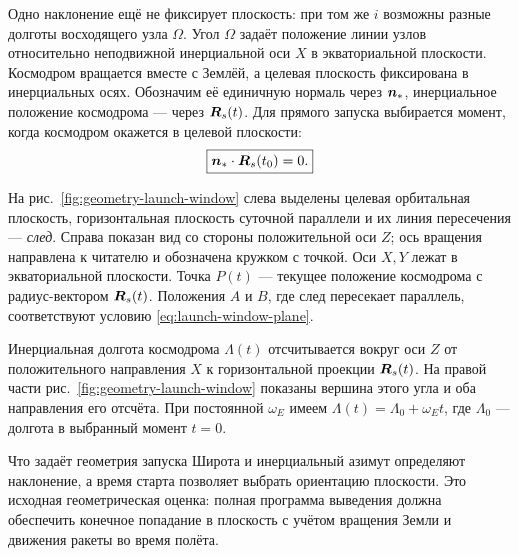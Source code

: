 Одно наклонение ещё не фиксирует плоскость: при том же $i$
возможны разные долготы восходящего узла $\Omega$.
Угол $\Omega$ задаёт положение линии узлов относительно
неподвижной инерциальной оси $X$ в экваториальной плоскости.
Космодром вращается вместе с Землёй, а целевая плоскость
фиксирована в инерциальных осях. Обозначим её единичную нормаль
через $\boldsymbol{n}_*$, инерциальное положение космодрома ---
через $\boldsymbol{R}_s(t)$. Для прямого запуска выбирается момент,
когда космодром окажется в целевой плоскости:
\begin{equation}
 \boxed{\boldsymbol{n}_*\cdot\boldsymbol{R}_s(t_0)=0.}
 \label{eq:launch-window-plane}
\end{equation}

На рис.~\ref{fig:geometry-launch-window} слева выделены целевая
орбитальная плоскость, горизонтальная плоскость суточной параллели
и их линия пересечения --- \emph{след}. Справа показан вид
со стороны положительной оси $Z$; ось вращения направлена к читателю
и обозначена кружком с точкой. Оси $X,Y$ лежат в экваториальной плоскости.
Точка $P(t)$ --- текущее положение космодрома с радиус-вектором $\boldsymbol{R}_s(t)$.
Положения $A$ и $B$, где след пересекает параллель,
соответствуют условию \eqref{eq:launch-window-plane}.

Инерциальная долгота космодрома $\Lambda(t)$ отсчитывается
вокруг оси $Z$ от положительного направления $X$
к горизонтальной проекции $\boldsymbol{R}_s(t)$.
На правой части рис.~\ref{fig:geometry-launch-window}
показаны вершина этого угла и оба направления его отсчёта.
При постоянной $\omega_E$ имеем
$\Lambda(t)=\Lambda_0+\omega_Et$,
где $\Lambda_0$ --- долгота в выбранный момент $t=0$.


\FloatBarrier
\begin{explanation}{Что задаёт геометрия запуска}
Широта и инерциальный азимут определяют наклонение,
а время старта позволяет выбрать ориентацию плоскости.
Это исходная геометрическая оценка: полная программа выведения
должна обеспечить конечное попадание в плоскость с учётом
вращения Земли и движения ракеты во время полёта.
\end{explanation}
\FloatBarrier
